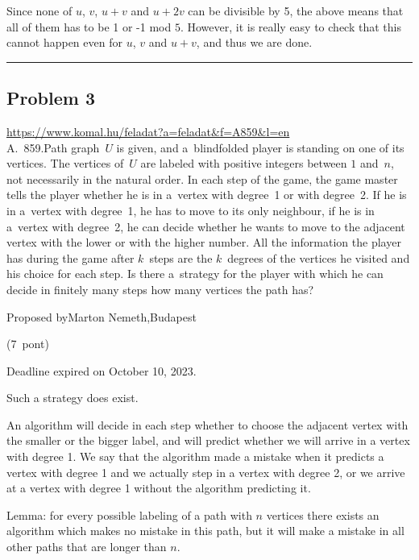 \documentclass{article}
\begin{document}
Since none of \(\displaystyle u\), \(\displaystyle v\), \(\displaystyle u+v\) and \(\displaystyle u+2v\) can be divisible by 5, the above means that all of them  has to be 1 or -1 mod \(\displaystyle 5\). However, it is really easy to check that this cannot happen even for \(\displaystyle u\), \(\displaystyle v\) and \(\displaystyle u+v\), and thus we are done.

\vspace{1em}
\hrule
\vspace{1em}

\subsection*{Problem 3}
\noindent\url{https://www.komal.hu/feladat?a=feladat&f=A859&l=en}\\[1em]

A. 859.Path graph \(\displaystyle U\) is given, and a blindfolded player is standing on one of its vertices. The vertices of \(\displaystyle U\) are labeled with positive integers between \(\displaystyle 1\) and \(\displaystyle n\), not necessarily in the natural order. In each step of the game, the game master tells the player whether he is in a vertex with degree 1 or with degree 2. If he is in a vertex with degree 1, he has to move to its only neighbour, if he is in a vertex with degree 2, he can decide whether he wants to move to the adjacent vertex with the lower or with the higher number. All the information the player has during the game after \(\displaystyle k\) steps are the \(\displaystyle k\) degrees of the vertices he visited and his choice for each step. Is there a strategy for the player with which he can decide in finitely many steps how many vertices the path has?

Proposed byMarton Nemeth,Budapest

(7 pont)

Deadline expired on October 10, 2023.

Such a strategy does exist.

An algorithm will decide in each step whether to choose the adjacent vertex with the smaller or the bigger label, and will predict whether we will arrive in a vertex with degree 1. We say that the algorithm made a mistake when it predicts a vertex with degree 1 and we actually step in a vertex with degree 2, or we arrive at a vertex with degree 1 without the algorithm predicting it.

Lemma: for every possible labeling of a path with \(\displaystyle n\) vertices there exists an algorithm which makes no mistake in this path, but it will make a mistake in all other paths that are longer than \(\displaystyle n\).
\end{document}
